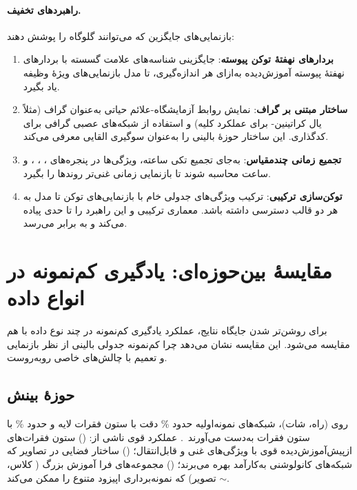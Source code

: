 \paragraph{راهبردهای تخفیف.} بازنمایی‌های جایگزین که می‌توانند گلوگاه را پوشش دهند:
\begin{enumerate}
\item \textbf{بردارهای نهفتۀ توکن پیوسته}: جایگزینی شناسه‌های علامت گسسته با بردارهای نهفتۀ پیوسته آموزش‌دیده به‌ازای هر اندازه‌گیری، تا مدل بازنمایی‌های ویژۀ وظیفه یاد بگیرد.
\item \textbf{ساختار مبتنی بر گراف}: نمایش روابط آزمایشگاه-علائم حیاتی به‌عنوان گراف (مثلاً یال کراتینین- برای عملکرد کلیه) و استفاده از شبکه‌های عصبی گرافی برای کدگذاری. این ساختار حوزۀ بالینی را به‌عنوان سوگیری القایی معرفی می‌کند.
\item \textbf{تجمیع زمانی چندمقیاس}: به‌جای تجمیع تکی  ساعته، ویژگی‌ها در پنجره‌های ، ، ، و  ساعت محاسبه شوند تا بازنمایی زمانی غنی‌تر روندها را بگیرد.
\item \textbf{توکن‌سازی ترکیبی}: ترکیب ویژگی‌های جدولی خام با بازنمایی‌های توکن تا مدل به هر دو قالب دسترسی داشته باشد. معماری ترکیبی  و  این راهبرد را تا حدی پیاده می‌کند و به  برابر  می‌رسد.
\end{enumerate}

\section{مقایسۀ بین‌حوزه‌ای: یادگیری کم‌نمونه در انواع داده}

برای روشن‌تر شدن جایگاه نتایج، عملکرد یادگیری کم‌نمونه در چند نوع داده با هم مقایسه می‌شود. این مقایسه نشان می‌دهد چرا کم‌نمونه جدولی بالینی از نظر بازنمایی و تعمیم با چالش‌های خاصی روبه‌روست.

\subsection{حوزۀ بینش}

روی  (راه، شات)، شبکه‌های نمونه‌اولیه حدود \% دقت با ستون فقرات  لایه و حدود \% با ستون فقرات  به‌دست می‌آورند~\cite{snell2017prototypical}. عملکرد قوی ناشی از: () ستون فقرات‌های ازپیش‌آموزش‌دیده قوی با ویژگی‌های غنی و قابل‌انتقال؛ () ساختار فضایی در تصاویر که شبکه‌های کانولوشنی به‌کارآمد بهره می‌برند؛ () مجموعه‌های فرا آموزش بزرگ ( کلاس، $\sim$ تصویر) که نمونه‌برداری اپیزود متنوع را ممکن می‌کند.

